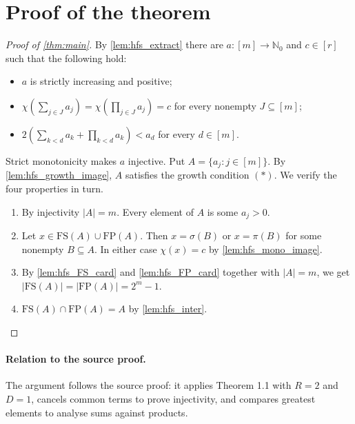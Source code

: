 \documentclass[11pt]{article}
\theoremstyle{definition}
\theoremstyle{remark}
\newcommand{\FS}{\mathrm{FS}}
\newcommand{\FP}{\mathrm{FP}}
\newcommand{\Nz}{\mathbb{N}_0}
\begin{document}
\section{Proof of the theorem}

\begin{proof}[Proof of \cref{thm:main}]
By \cref{lem:hfs_extract} there are $a:[m]\to\Nz$ and $c\in[r]$ such that the following hold:
\begin{itemize}
\item $a$ is strictly increasing and positive;
\item $\chi(\sum_{j\in J}a_j)=\chi(\prod_{j\in J}a_j)=c$ for every nonempty $J\subseteq[m]$;
\item $2(\sum_{k<d}a_k+\prod_{k<d}a_k)<a_d$ for every $d\in[m]$.
\end{itemize}
Strict monotonicity makes $a$ injective. Put $A=\{a_j:j\in[m]\}$. By \cref{lem:hfs_growth_image}, $A$ satisfies the growth condition $(\ast)$. We verify the four properties in turn.

\begin{enumerate}
\item By injectivity $|A|=m$. Every element of $A$ is some $a_j>0$.
\item Let $x\in\FS(A)\cup\FP(A)$. Then $x=\sigma(B)$ or $x=\pi(B)$ for some nonempty $B\subseteq A$. In either case $\chi(x)=c$ by \cref{lem:hfs_mono_image}.
\item By \cref{lem:hfs_FS_card} and \cref{lem:hfs_FP_card} together with $|A|=m$, we get $|\FS(A)|=|\FP(A)|=2^m-1$.
\item $\FS(A)\cap\FP(A)=A$ by \cref{lem:hfs_inter}. \qedhere
\end{enumerate}
\end{proof}

\paragraph{Relation to the source proof.}
The argument follows the source proof: it applies Theorem 1.1 with $R=2$ and $D=1$, cancels common terms to prove injectivity, and compares greatest elements to analyse sums against products.
\end{document}
